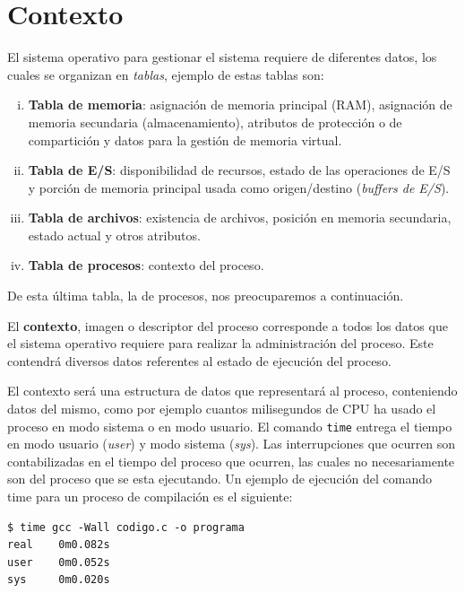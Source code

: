 \section{Contexto}
El sistema operativo para gestionar el sistema requiere de diferentes datos, los
cuales se organizan en \textit{tablas}, ejemplo de estas tablas son:

\begin{enumerate}[i.]

	\item \textbf{Tabla de memoria}: asignación de memoria principal (RAM),
	asignación de memoria secundaria (almacenamiento), atributos de
	protección o de compartición y datos para la gestión de memoria virtual.

	\item \textbf{Tabla de E/S}: disponibilidad de recursos, estado de las
	operaciones de E/S y porción de memoria principal usada como
	origen/destino (\textit{buffers de E/S}).

	\item \textbf{Tabla de archivos}: existencia de archivos, posición en
	memoria secundaria, estado actual y otros atributos.

	\item \textbf{Tabla de procesos}: contexto del proceso.

\end{enumerate}

De esta última tabla, la de procesos, nos preocuparemos a continuación.

El \textbf{contexto}, imagen o descriptor del proceso corresponde a todos los
datos que el sistema operativo requiere para realizar la administración del
proceso. Este contendrá diversos datos referentes al estado de ejecución
del proceso.

El contexto será una estructura de datos que representará al proceso,
conteniendo datos del mismo, como por ejemplo cuantos milisegundos de CPU ha
usado el proceso en modo sistema o en modo usuario. El comando \texttt{time}
entrega el tiempo en modo usuario (\textit{user}) y modo sistema (\textit{sys}).
Las interrupciones que ocurren son contabilizadas en el tiempo del proceso que
ocurren, las cuales no necesariamente son del proceso que se esta ejecutando.
Un ejemplo de ejecución del comando time para un proceso de compilación es el
siguiente:

\begin{verbatim}
$ time gcc -Wall codigo.c -o programa
real    0m0.082s
user    0m0.052s
sys     0m0.020s
\end{verbatim}


